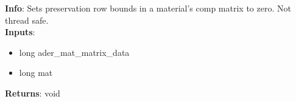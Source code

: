 \textbf{Info}: Sets preservation row bounds in a material's comp matrix to
zero. Not thread safe. \\

\noindent \textbf{Inputs}:
\begin{itemize}
\item{long ader\_mat\_matrix\_data}
\item{long mat}
\end{itemize}

\noindent \textbf{Returns}: void
